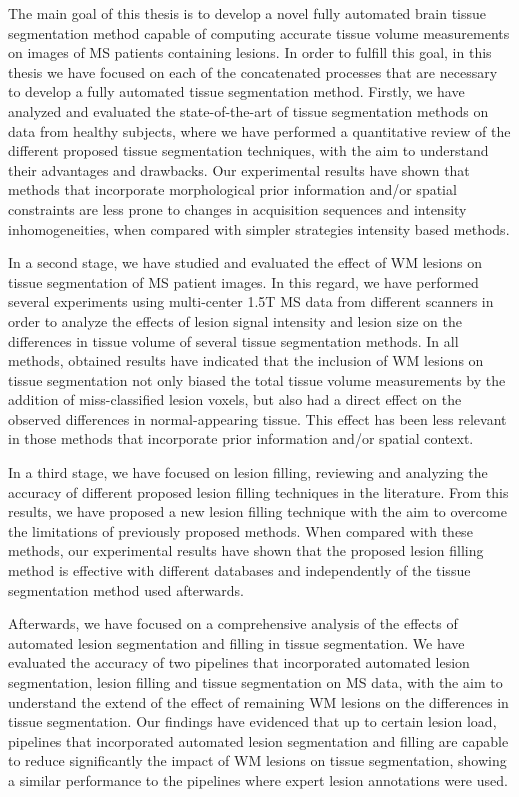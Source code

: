 The main goal of this thesis is to develop a novel fully automated brain tissue segmentation method capable of computing accurate tissue volume measurements on images of MS patients containing lesions. In order to fulfill this goal, in this thesis we have focused on each of the concatenated processes that are necessary to develop a fully automated tissue segmentation method. Firstly, we have analyzed and evaluated the state-of-the-art of tissue segmentation methods on data from healthy subjects, where we have performed a quantitative review of the different proposed tissue segmentation techniques, with the aim to understand their advantages and drawbacks. Our experimental results have shown that methods that incorporate morphological prior information and/or spatial constraints are less prone to changes in acquisition sequences and intensity inhomogeneities, when compared with simpler strategies intensity based methods.   

In a second stage, we have studied and evaluated the effect of WM lesions on tissue segmentation of MS patient images. In this regard, we have performed several experiments using multi-center 1.5T MS data from different scanners in order to analyze the effects of lesion signal intensity and lesion size on the differences in tissue volume of several tissue segmentation methods. In all methods, obtained results have indicated that the inclusion of WM lesions on tissue segmentation not only biased the total tissue volume measurements by the addition of miss-classified lesion voxels, but also had a direct effect on the observed differences in normal-appearing tissue. This effect has been less relevant in those methods that incorporate prior information and/or spatial context. 

In a third stage, we have focused on lesion filling, reviewing and analyzing the accuracy of different proposed lesion filling techniques in the literature. From this results, we have proposed a new lesion filling technique with the aim to overcome the limitations of previously proposed methods. When compared with these methods, our experimental results have shown that the proposed lesion filling method is effective  with different databases and independently of the tissue segmentation method used afterwards. 

Afterwards, we have focused on a comprehensive analysis of the effects of automated lesion segmentation and filling in tissue segmentation. We have evaluated the accuracy of two pipelines that incorporated automated lesion segmentation, lesion filling and tissue segmentation on MS data, with the aim to understand the extend of the effect of remaining WM lesions on the differences in tissue segmentation. Our findings have evidenced that up to certain lesion load, pipelines that incorporated automated lesion segmentation and filling are capable to reduce significantly the impact of WM lesions on tissue segmentation, showing a similar performance to the pipelines where expert lesion annotations were used.

